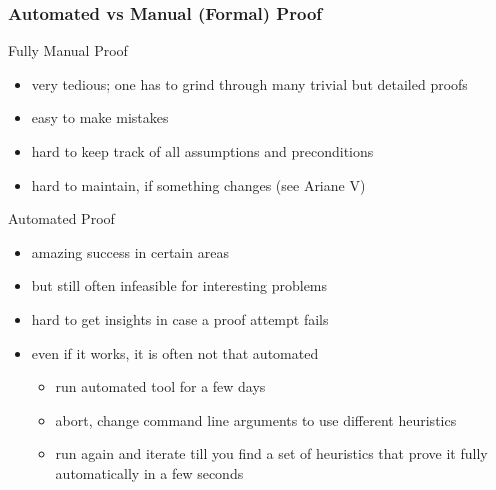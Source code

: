 \begin{frame}
\frametitle{Automated vs Manual (Formal) Proof}

\begin{block}{Fully Manual Proof}
\begin{itemize}
\item very tedious; one has to grind through many trivial but detailed proofs
\item easy to make mistakes
\item hard to keep track of all assumptions and preconditions  
\item hard to maintain, if something changes (see Ariane V)
\end{itemize}
\end{block}

\begin{block}{Automated Proof}
\begin{itemize}
\item amazing success in certain areas
\item but still often infeasible for interesting problems
\item hard to get insights in case a proof attempt fails
\item even if it works, it is often not that automated
\begin{itemize}
\item run automated tool for a few days
\item abort, change command line arguments to use different heuristics
\item run again and iterate till you find a set of heuristics that prove it fully automatically in a few seconds
\end{itemize}
\end{itemize}
\end{block}
\end{frame}




